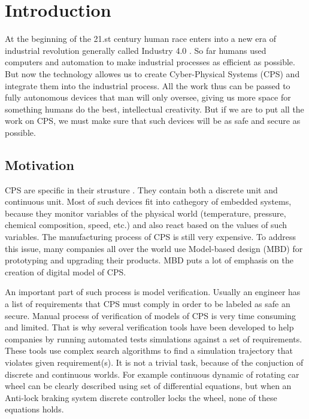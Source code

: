 \chapter{Introduction}
\enlargethispage*{5pt}

At the beginning of the 21.st century human race enters into a new era of industrial revolution generally called Industry 4.0 \cite{Xu:Industry4.0}. So far humans used computers and automation to make industrial processes as efficient as possible. But now the technology allowes us to create Cyber-Physical Systems (CPS) and integrate them into the industrial process. All the work thus can be passed to fully autonomous devices that man will only oversee, giving us more space for something humans do the best, intellectual creativity. But if we are to put all the work on CPS, we must make sure that such devices will be as safe and secure as possible.

\section{Motivation}
CPS are specific in their strusture \cite{Florence:CPSspecification}. They contain both a discrete unit and continuous unit. Most of such devices fit into cathegory of embedded systems, because they monitor variables of the physical world (temperature, pressure, chemical composition, speed, etc.) and also react based on the values of such variables. The manufacturing process of CPS is still very expensive. To address this issue, many companies all over the world use Model-based design (MBD) for prototyping and upgrading their products. MBD puts a lot of emphasis on the creation of digital model of CPS.

An important part of such process is model verification. Usually an engineer has a list of requirements that CPS must comply in order to be labeled as safe an secure. Manual process of verification of models of CPS is very time consuming and limited. That is why several verification tools have been developed to help companies by running automated tests simulations against a set of requirements. These tools use complex search algorithms to find a simulation trajectory that violates given requirement(s). It is not a trivial task, because of the conjuction of discrete and continuous worlds. For example continuous dynamic of rotating car wheel can be clearly described using set of differential equations, but when an Anti-lock braking system discrete controller locks the wheel, none of these equations holds.

